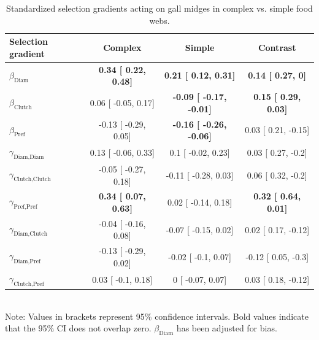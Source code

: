 \documentclass[11pt,]{article}
\begin{document}
\bigskip

\begin{table}[h]
\caption{Standardized selection gradients acting on gall midges in complex vs. simple food webs.}
\label{Table:Gradients}
\centering
\begin{tabular}{lccc}
\\ 
\hline
\textbf{Selection gradient} & \textbf{Complex} & \textbf{Simple} & \textbf{Contrast}  \\ 
\hline
$\beta_{\text{Diam}}$ & 
\textbf{
0.34 [
0.22,
0.48] }& 
\textbf{
0.21 [
0.12,
0.31] }& 
\textbf{
0.14 [
0.27,
0] }\\

$\beta_{\text{Clutch}}$ & 
0.06 [
-0.05,
0.17] & 
\textbf{
-0.09 [
-0.17,
-0.01] }& 
\textbf{
0.15 [
0.29,
0.03] }\\

$\beta_{\text{Pref}}$ &
-0.13 [
-0.29,
0.05] & 
\textbf{
-0.16 [
-0.26,
-0.06] }& 

0.03 [
0.21,
-0.15] \\

$\gamma_{\text{Diam,Diam}}$ &
0.13 [
-0.06,
0.33] & 

0.1 [
-0.02,
0.23] & 

0.03 [
0.27,
-0.2] \\

$\gamma_{\text{Clutch,Clutch}}$ & 
-0.05 [
-0.27,
0.18] & 

-0.11 [
-0.28,
0.03] & 

0.06 [
0.32,
-0.2] \\

$\gamma_{\text{Pref,Pref}}$ & 
\textbf{
0.34 [
0.07,
0.63] }& 

0.02 [
-0.14,
0.18] & 
\textbf{
0.32 [
0.64,
0.01] }\\

$\gamma_{\text{Diam,Clutch}}$ & 
-0.04 [
-0.16,
0.08] & 

-0.07 [
-0.15,
0.02] & 

0.02 [
0.17,
-0.12] \\

$\gamma_{\text{Diam,Pref}}$ & 
-0.13 [
-0.29,
0.02] & 

-0.02 [
-0.1,
0.07] & 

-0.12 [
0.05,
-0.3] \\

$\gamma_{\text{Clutch,Pref}}$ & 
0.03 [
-0.1,
0.18] & 

0 [
-0.07,
0.07] & 

0.03 [
0.18,
-0.12] \\ 
\hline
\end{tabular}
\bigskip{}
\\
{\footnotesize Note: Values in brackets represent 95\% confidence intervals. Bold values indicate that the 95\% CI does not overlap zero. $\beta_{\text{Diam}}$ has been adjusted for bias.}
\end{table}
\end{document}
